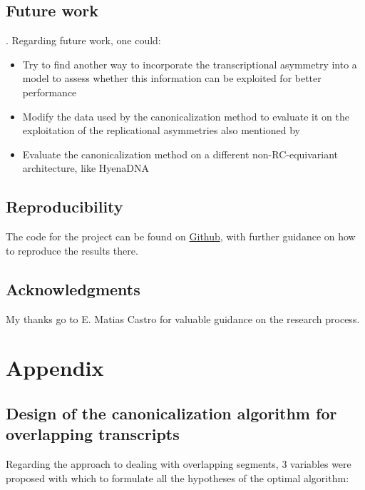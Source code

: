 \documentclass[   ]{article}
\begin{document}
\subsection{Future work}.
Regarding future work, one could:
\begin{itemize}
	\item Try to find another way to incorporate the transcriptional asymmetry into a model to assess whether this information can be exploited for better performance
	\item Modify the data used by the canonicalization method to evaluate it on the exploitation of the replicational asymmetries also mentioned by \citet{moeckelStrandAsymmetriesGenomic2023}
	\item Evaluate the canonicalization method on a different non-RC-equivariant architecture, like HyenaDNA\citep{nguyenHyenaDNALongRangeGenomic2023}
\end{itemize}

\subsection*{Reproducibility}
The code for the project can be found on \href{https://github.com/PipeVerri/Canonicalization}{Github}, with further guidance on how to reproduce the results there.

\subsection*{Acknowledgments}
My thanks go to E. Matias Castro for valuable guidance on the research process.




\appendix
\section{Appendix}

\subsection{Design of the canonicalization algorithm for overlapping transcripts}\label{sec:design-of-the-canonicalization-algorithm}
Regarding the approach to dealing with overlapping segments, 3 variables were proposed with which to formulate all the
hypotheses of the optimal algorithm: 
\end{document}
